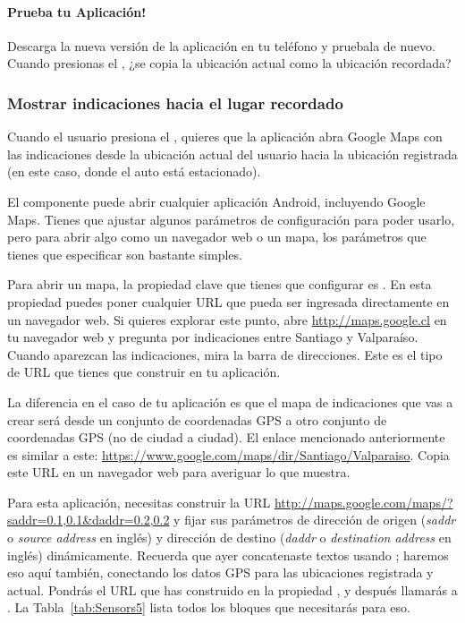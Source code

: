 \paragraph{Prueba tu Aplicación!} Descarga la nueva versión de la
aplicación en tu teléfono y pruebala de nuevo. Cuando presionas el
, ¿se copia la ubicación actual como la
ubicación recordada?

\subsubsection*{Mostrar indicaciones hacia el lugar recordado}

Cuando el usuario presiona el ,
quieres que la aplicación abra Google Maps con las indicaciones desde
la ubicación actual del usuario hacia la ubicación registrada (en este
caso, donde el auto está estacionado).

El componente  puede abrir cualquier
aplicación Android, incluyendo Google Maps. Tienes que ajustar algunos
parámetros de configuración para poder usarlo, pero para abrir algo
como un navegador web o un mapa, los parámetros que tienes que
especificar son bastante simples.

Para abrir un mapa, la propiedad clave que tienes que configurar es
. En esta propiedad puedes poner
cualquier URL que pueda ser ingresada directamente en un navegador
web. Si quieres explorar este punto, abre \url{http://maps.google.cl}
en tu navegador web y pregunta por indicaciones entre Santiago y
Valparaíso. Cuando aparezcan las indicaciones, mira la barra de
direcciones. Este es el tipo de URL que tienes que construir en tu
aplicación.

La diferencia en el caso de tu aplicación es que el mapa de
indicaciones que vas a crear será desde un conjunto de coordenadas GPS
a otro conjunto de coordenadas GPS (no de ciudad a ciudad). El enlace
mencionado anteriormente es similar a este:
\url{https://www.google.com/maps/dir/Santiago/Valparaiso}. Copia este
URL en un navegador web para averiguar lo que muestra.

Para esta aplicación, necesitas construir la URL
\url{http://maps.google.com/maps/?saddr=0.1,0.1\&daddr=0.2,0.2} y
fijar sus parámetros de dirección de origen (\emph{saddr} o
\emph{source address} en inglés) y dirección de destino (\emph{daddr}
o \emph{destination address} en inglés) dinámicamente. Recuerda que
ayer concatenaste textos usando ; haremos eso aquí
también, conectando los datos GPS para las ubicaciones registrada y
actual. Pondrás el URL que has construido en la propiedad
, y después llamarás a
. La Tabla~\ref{tab:Sensors5}
lista todos los bloques que necesitarás para eso.

